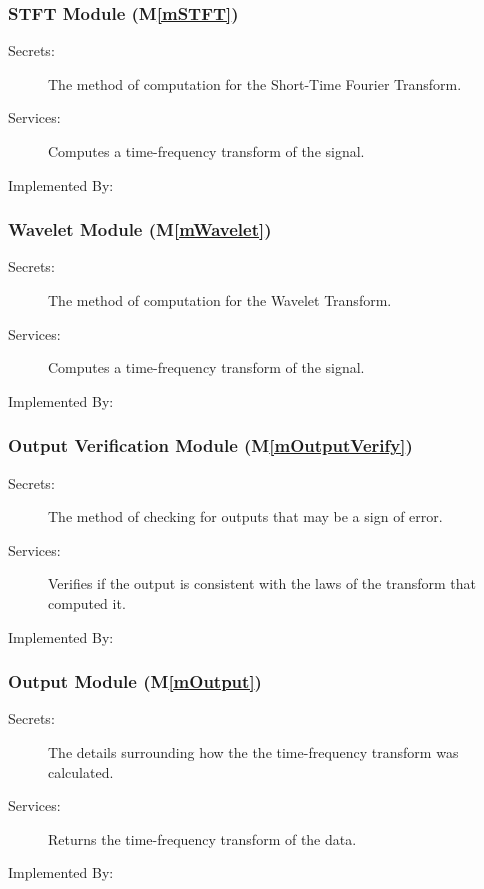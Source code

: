 \documentclass[12pt, titlepage]{article}
\newcommand{\mref}[1]{M\ref{#1}}
\begin{document}
\subsubsection{STFT Module (\mref{mSTFT})}

\begin{description}
\item[Secrets:]The method of computation for the Short-Time Fourier Transform.
\item[Services:]Computes a time-frequency transform of the signal.
\item[Implemented By:] \progname{}
\end{description}


\subsubsection{Wavelet Module (\mref{mWavelet})}

\begin{description}
\item[Secrets:]The method of computation for the Wavelet Transform.
\item[Services:]Computes a time-frequency transform of the signal.
\item[Implemented By:] \progname{}
\end{description}


\subsubsection{Output Verification Module (\mref{mOutputVerify})}

\begin{description}
\item[Secrets:]The method of checking for outputs that may be a sign of error.
\item[Services:]Verifies if the output is consistent with the laws of the transform that computed it.
\item[Implemented By:] \progname{}
\end{description}


\subsubsection{Output Module (\mref{mOutput})}

\begin{description}
\item[Secrets:] The details surrounding how the the time-frequency transform was calculated.
\item[Services:]Returns the time-frequency transform of the data.
\item[Implemented By:] \progname{}
\end{description}
\end{document}
